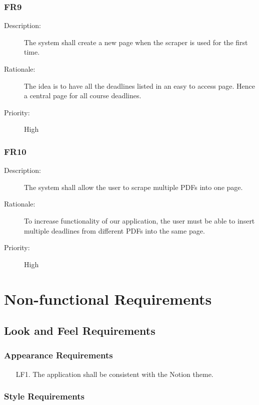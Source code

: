 \documentclass[12pt, titlepage]{article}
\begin{document}
\subsubsection{FR9}

\begin{description}
  \item[Description:] The system shall create a new page when the scraper is used for the first time.  
  \item[Rationale:] The idea is to have all the deadlines listed in an easy to access page. Hence a central page for all course deadlines. 
  \item[Priority:] High
\end{description}

\subsubsection{FR10}

\begin{description}
  \item[Description:] The system shall allow the user to scrape multiple PDFs into one page. 
  \item[Rationale:] To increase functionality of our application, the user must be able to insert multiple deadlines from different PDFs into the same page. 
  \item[Priority:] High
\end{description}

\section{Non-functional Requirements}

\subsection{Look and Feel Requirements}

\subsubsection{Appearance Requirements}

\begin{itemize}
  \item[LF1.] The application shall be consistent with the Notion theme. 
\end{itemize}

\subsubsection{Style Requirements}
\end{document}
